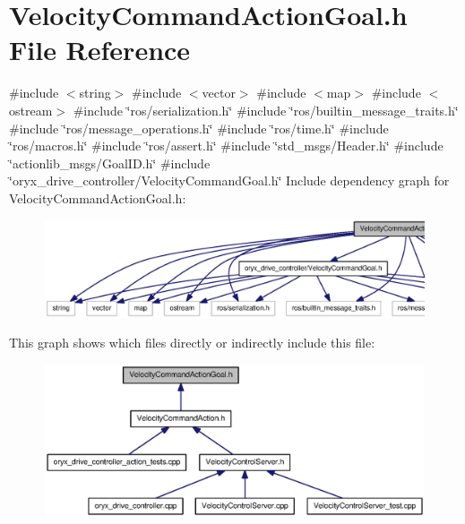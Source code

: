 \section{\-Velocity\-Command\-Action\-Goal.\-h \-File \-Reference}
\label{VelocityCommandActionGoal_8h}
{\ttfamily \#include $<$string$>$}\*
{\ttfamily \#include $<$vector$>$}\*
{\ttfamily \#include $<$map$>$}\*
{\ttfamily \#include $<$ostream$>$}\*
{\ttfamily \#include \char`\"{}ros/serialization.\-h\char`\"{}}\*
{\ttfamily \#include \char`\"{}ros/builtin\-\_\-message\-\_\-traits.\-h\char`\"{}}\*
{\ttfamily \#include \char`\"{}ros/message\-\_\-operations.\-h\char`\"{}}\*
{\ttfamily \#include \char`\"{}ros/time.\-h\char`\"{}}\*
{\ttfamily \#include \char`\"{}ros/macros.\-h\char`\"{}}\*
{\ttfamily \#include \char`\"{}ros/assert.\-h\char`\"{}}\*
{\ttfamily \#include \char`\"{}std\-\_\-msgs/\-Header.\-h\char`\"{}}\*
{\ttfamily \#include \char`\"{}actionlib\-\_\-msgs/\-Goal\-I\-D.\-h\char`\"{}}\*
{\ttfamily \#include \char`\"{}oryx\-\_\-drive\-\_\-controller/\-Velocity\-Command\-Goal.\-h\char`\"{}}\*
\-Include dependency graph for \-Velocity\-Command\-Action\-Goal.\-h\-:
\nopagebreak
\begin{figure}[H]
\begin{center}
\leavevmode
\includegraphics[width=350pt]{VelocityCommandActionGoal_8h__incl}
\end{center}
\end{figure}
\-This graph shows which files directly or indirectly include this file\-:
\nopagebreak
\begin{figure}[H]
\begin{center}
\leavevmode
\includegraphics[width=350pt]{VelocityCommandActionGoal_8h__dep__incl}
\end{center}
\end{figure}
